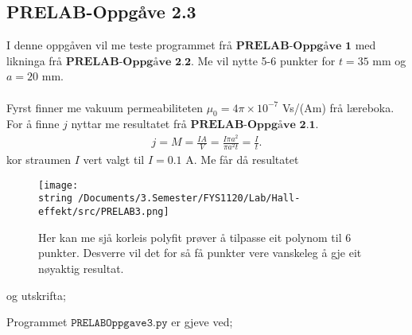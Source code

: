 \documentclass[11pt, a4paper]{article}
\theoremstyle{definition}
\begin{document}
  \subsection*{PRELAB-Oppgåve 2.3}
    I denne oppgåven vil me teste programmet frå $\textbf{PRELAB-Oppgåve 1}$ med likninga frå $\textbf{PRELAB-Oppgåve 2.2}$.
    Me vil nytte 5-6 punkter for $t = 35$ mm og $a = 20$ mm. \\ \\
    Fyrst finner me vakuum permeabiliteten $\mu_0 = 4\pi \times 10^{-7}$ Vs/(Am) frå læreboka. For å finne $j$ nyttar me resultatet frå $\textbf{PRELAB-Oppgåve 2.1}$.
    \begin{align*}
      j = M = \frac{IA}{V} = \frac{I\pi a^2}{\pi a^2t} = \frac{I}{t}.
    \end{align*}
    kor straumen $I$ vert valgt til $I = 0.1$ A. Me får då resultatet
    \begin{figure}[H]
      \centering
      \texttt{[image: \\string~/Documents/3.Semester/FYS1120/Lab/Hall-effekt/src/PRELAB3.png]}
      \caption{Her kan me sjå korleis polyfit prøver å tilpasse eit polynom til 6 punkter. Desverre vil det for så få punkter vere vanskeleg å gje eit nøyaktig resultat.}
    \end{figure}
    og utskrifta;
    
    Programmet $\texttt{PRELABOppgave3.py}$ er gjeve ved;
    
\end{document}
